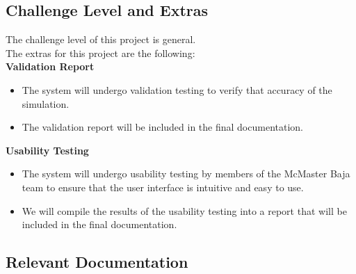 \documentclass[12pt, titlepage]{article}
\begin{document}
\subsection{Challenge Level and Extras}

The challenge level of this project is general.\\
\newline
The extras for this project are the following:\\
\textbf{Validation Report}
{\begin{itemize}
  \item The system will undergo validation testing to verify that accuracy of the simulation.
  \item The validation report will be included in the final documentation.
\end{itemize}}
{\noindent}
\textbf{Usability Testing}
{\begin{itemize}
  \item The system will undergo usability testing by members of the McMaster Baja team to ensure that
  the user interface is intuitive and easy to use.
  \item We will compile the results of the usability testing into a report that will be included in the final documentation.
\end{itemize}}

\subsection{Relevant Documentation}

\end{document}
